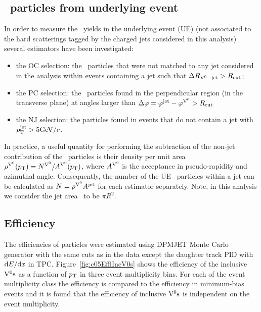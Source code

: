 \subsection{\Vzero\ particles from underlying event}
\label{sec:V0UE}

In order to measure the \Vzero\ yields in the underlying event (UE) (not associated to the hard scatterings tagged by the charged jets considered in this analysis) several estimators have been investigated:
\begin{itemize}
  \item the OC selection: the \Vzero\ particles that were not matched to any jet considered in the analysis within events containing a jet such that $\Delta R_{{\rm V}^{0}-{\rm jet}} > R_{\rm cut}$;
  \item the PC selection: the \Vzero\ particles found in the perpendicular region (in the transverse plane) at angles larger than $\Delta \varphi = \varphi^{\rm jet} - \varphi^{{\rm V}^{0}} > R_{\rm cut}$ 
  \item the NJ selection: the \Vzero particles found in events that do not contain a jet with $p_{\mathrm{T}}^{\mathrm{jet}}>5 \mathrm{GeV}/c$.
\end{itemize}

In practice, a useful quantity for performing the subtraction of the non-jet contribution of the \Vzero\ particles is their density per unit area $\rho^{{\rm V}^{0}}(p_{\mathrm{T}})=N^{{\rm V}^{0}}/A^{{\rm V}^{0}}(p_{\mathrm{T}})$, where $A^{{\rm V}^{0}}$ is the acceptance in pseudo-rapidity and azimuthal angle. Consequently, the number of the UE \Vzero\ particles within a jet can be calculated as $N=\rho^{{\rm V}^{0}} A^{\mathrm{jet}}$ for each estimator separately. Note, in this analysis we consider the jet area \Ajet\ to be $\pi R^2$.

\subsection{Efficiency}
\label{sec:c05V0EffiMC}

The efficiencies of \Vzero particles were estimated using DPMJET Monte Carlo generator \cite{Roesler:2000he} with the same cuts as in the data except the daughter track PID with ${\rm d}E/{\rm d}x$ in TPC. 
Figure~\ref{fig:c05EffiIncV0s} shows the efficiency of the inclusive ${\rm V}^{0}{\rm s}$ as a function of $p_{\mathrm{T}}$ in three event multiplicity bins. For each of the event multiplicity class the efficiency is compared to the efficiency in minimum-bias events and it is found that the efficiency of inclusive ${\rm V}^{0}{\rm s}$ is independent on the event multiplicity.

